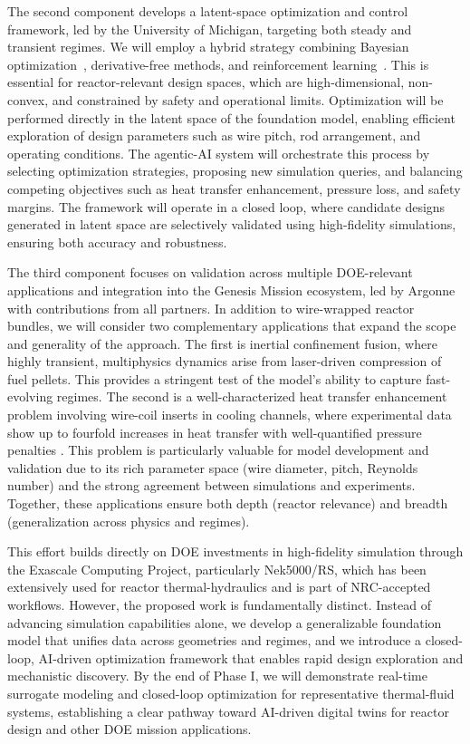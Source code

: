 The second component develops a latent-space optimization and control framework, led by the University of Michigan, targeting both steady and transient regimes. We will employ a hybrid strategy combining Bayesian optimization~\cite{Morita2022BOCFD}, derivative-free methods, and reinforcement learning~\cite{Font2025DRLFlowControl}. This is essential for reactor-relevant design spaces, which are high-dimensional, non-convex, and constrained by safety and operational limits. Optimization will be performed directly in the latent space of the foundation model, enabling efficient exploration of design parameters such as wire pitch, rod arrangement, and operating conditions. The agentic-AI system will orchestrate this process by selecting optimization strategies, proposing new simulation queries, and balancing competing objectives such as heat transfer enhancement, pressure loss, and safety margins. The framework will operate in a closed loop, where candidate designs generated in latent space are selectively validated using high-fidelity simulations, ensuring both accuracy and robustness.

The third component focuses on validation across multiple DOE-relevant applications and integration into the Genesis Mission ecosystem, led by Argonne with contributions from all partners. In addition to wire-wrapped reactor bundles, we will consider two complementary applications that expand the scope and generality of the approach. The first is inertial confinement fusion, where highly transient, multiphysics dynamics arise from laser-driven compression of fuel pellets. This provides a stringent test of the model’s ability to capture fast-evolving regimes. The second is a well-characterized heat transfer enhancement problem involving wire-coil inserts in cooling channels, where experimental data show up to fourfold increases in heat transfer with well-quantified pressure penalties . This problem is particularly valuable for model development and validation due to its rich parameter space (wire diameter, pitch, Reynolds number) and the strong agreement between simulations and experiments. Together, these applications ensure both depth (reactor relevance) and breadth (generalization across physics and regimes).

This effort builds directly on DOE investments in high-fidelity simulation through the Exascale Computing Project, particularly Nek5000/RS, which has been extensively used for reactor thermal-hydraulics and is part of NRC-accepted workflows. However, the proposed work is fundamentally distinct. Instead of advancing simulation capabilities alone, we develop a generalizable foundation model that unifies data across geometries and regimes, and we introduce a closed-loop, AI-driven optimization framework that enables rapid design exploration and mechanistic discovery. By the end of Phase I, we will demonstrate real-time surrogate modeling and closed-loop optimization for representative thermal-fluid systems, establishing a clear pathway toward AI-driven digital twins for reactor design and other DOE mission applications.

